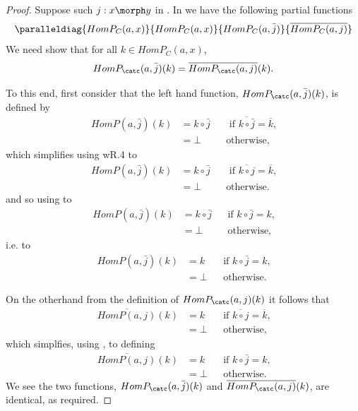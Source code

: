 \begin{proof}
Suppose such  $j: x \morph y$ in \catc.
In \Par we have the following partial functions
\[
\paralleldiag{HomP_C(a,x)}{HomP_C(a,x)}{HomP_C(a,\bar{j})}{\overline{HomP_C(a,j)}}
\]
We need show that for all $k \in HomP_C(a,x)$,
\[
HomP_\catc(a,\bar{j})(k)=\overline{HomP_\catc(a,j)}(k).
\]

To this end,
first consider that  the left hand function, $HomP_\catc(a,\bar{j})(k)$, is defined by
\begin{align*}
HomP(a,\bar{j})(k) &= k \circ \bar{j}  &&\mbox{ if $\overline{k \circ \bar{j}} = \overline{k}$,} \\
             &=\bot        && \mbox{otherwise,}
\end{align*}
which  simplifies using wR.4 to
\begin{align*}
HomP(a,\bar{j})(k) &= k \circ \bar{j} &&\mbox{ if $\overline{k \circ j} = \overline{k}$,} \\
             &=\bot        && \mbox{otherwise.}
\end{align*}
and so using  to
\begin{align*}
HomP(a,\bar{j})(k) 
            &= k \circ \bar{j} &&\mbox{if $k \circ \bar{j} = k$,} \\
            &=\bot        && \mbox{otherwise,}
\end{align*}
i.e. to
\begin{align*}
HomP(a,\bar{j})(k) 
            &= k          &&\mbox{if $k \circ \bar{j} = k$,} \\
            &=\bot        && \mbox{otherwise.}
\end{align*}

On the otherhand from the definition of $HomP_\catc(a,j)(k)$ it follows that
\begin{align*}
\overline{HomP(a,j)}(k) 
            &= k         &&\mbox{if $\overline{k \circ j} = \overline{k}$,} \\
            &=\bot        && \mbox{otherwise,}
\end{align*}
which simplfies, using , to defining
\begin{align*}
\overline{HomP(a,j)}(k) 
            &= k  &&\mbox{if $k \circ \bar{j} = k$,} \\
            &=\bot             && \mbox{otherwise.}
\end{align*}
We see the two functions, $HomP_\catc(a,\bar{j})(k)$ and $\overline{HomP_\catc(a,j)}(k)$, are identical, as required.
\end{proof}

